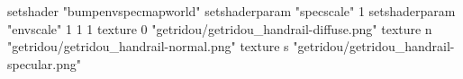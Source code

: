 setshader "bumpenvspecmapworld"
setshaderparam "specscale" 1
setshaderparam "envscale" 1 1 1
texture 0 "getridou/getridou_handrail-diffuse.png"
texture n "getridou/getridou_handrail-normal.png"
texture s "getridou/getridou_handrail-specular.png"
